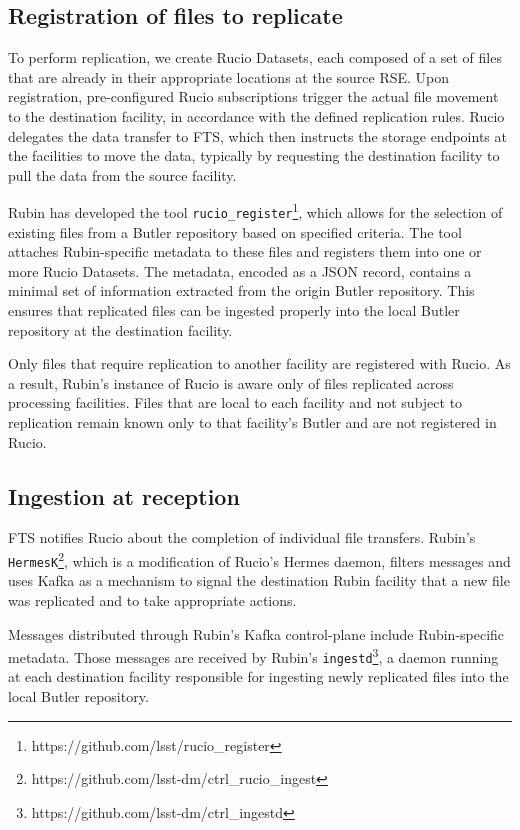 \documentclass{webofc}
\begin{document}
\subsection{Registration of files to replicate}
\label{registration}

To perform replication, we create Rucio Datasets, each composed of a set of files that are already in their appropriate locations at the source RSE. Upon registration, pre-configured Rucio subscriptions trigger the actual file movement to the destination facility, in accordance with the defined replication rules. Rucio delegates the data transfer to FTS, which then instructs the storage endpoints at the facilities to move the data, typically by requesting the destination facility to pull the data from the source facility.

Rubin has developed the tool \texttt{rucio\_register}\footnote{https://github.com/lsst/rucio\_register}, which allows for the selection of existing files from a Butler repository based on specified criteria. The tool attaches Rubin-specific metadata to these files and registers them into one or more Rucio Datasets. The metadata, encoded as a JSON record, contains a minimal set of information extracted from the origin Butler repository. This ensures that replicated files can be ingested properly into the local Butler repository at the destination facility.

Only files that require replication to another facility are registered with Rucio. As a result, Rubin's instance of Rucio is aware only of files replicated across processing facilities. Files that are local to each facility and not subject to replication remain known only to that facility's Butler and are not registered in Rucio.

\subsection{Ingestion at reception}
\label{ingestion}

FTS notifies Rucio about the completion of individual file transfers. Rubin's \texttt{HermesK}\footnote{https://github.com/lsst-dm/ctrl\_rucio\_ingest}, which is a modification of Rucio's Hermes daemon, filters messages and uses Kafka as a mechanism to signal the destination Rubin facility that a new file was replicated and to take appropriate actions.

Messages distributed through Rubin's Kafka control-plane include Rubin-specific metadata. Those messages are received by Rubin's \texttt{ingestd}\footnote{https://github.com/lsst-dm/ctrl\_ingestd}, a daemon running at each destination facility responsible for ingesting newly replicated files into the local Butler repository.
\end{document}
